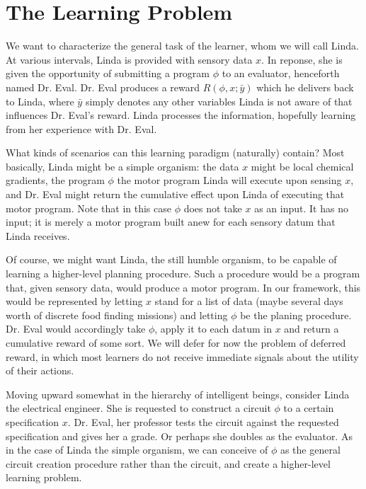 \documentclass{article}
\begin{document}
\newcommand{\learner}{\emph{Learner }}
\newcommand{\evaluator}{\emph{Evaluator }}



\section{The Learning Problem}
We want to characterize the general task of the learner, whom we will
call Linda. At various intervals, Linda is provided with sensory data
$x$. In reponse, she is given the opportunity of submitting a program
$\phi$ to an evaluator, henceforth named Dr. Eval. Dr. Eval produces a
reward $R(\phi, x; \bar{y})$ which he delivers back to Linda, where
$\bar{y}$ simply denotes any other variables Linda is not aware of
that influences Dr. Eval's reward. Linda processes the information,
hopefully learning from her experience with Dr. Eval.

What kinds of scenarios can this learning paradigm (naturally)
contain? Most basically, Linda might be a simple organism: the data
$x$ might be local chemical gradients, the program $\phi$ the motor
program Linda will execute upon sensing $x$, and Dr. Eval might return
the cumulative effect upon Linda of executing that motor program. Note
that in this case $\phi$ does not take $x$ as an input. It has no
input; it is merely a motor program built anew for each sensory datum
that Linda receives.

Of course, we might want Linda, the still humble organism, to be
capable of learning a higher-level planning procedure. Such a
procedure would be a program that, given sensory data, would produce a
motor program. In our framework, this would be represented by letting
$x$ stand for a list of data (maybe several days worth of discrete
food finding missions) and letting $\phi$ be the planing
procedure. Dr. Eval would accordingly take $\phi$, apply it to each
datum in $x$ and return a cumulative reward of some sort. We will
defer for now the problem of deferred reward, in which most learners
do not receive immediate signals about the utility of their actions.

Moving upward somewhat in the hierarchy of intelligent beings,
consider Linda the electrical engineer. She is requested to construct
a circuit $\phi$ to a certain specification $x$. Dr. Eval, her
professor tests the circuit against the requested specification and
gives her a grade. Or perhaps she doubles as the evaluator. As in the
case of Linda the simple organism, we can conceive of $\phi$ as the
general circuit creation procedure rather than the circuit, and create
a higher-level learning problem.
\end{document}
